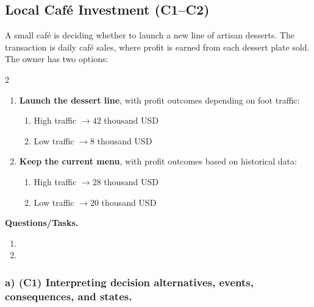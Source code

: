 	\subsection{Local Café Investment (C1--C2)}
	\label{sec:problem1-local-cafe-investment-c1-c2}
	A small café is deciding whether to launch a new line of artisan desserts. The transaction is daily café sales, where profit is earned from each dessert plate sold. The owner has two options:
	\begin{multicols}{2}
		\begin{enumerate}[label=\arabic*.]
			\item \textbf{Launch the dessert line}, with profit outcomes depending on foot traffic:
			\begin{enumerate}[label=\roman*)]
				\item High traffic $\to 42$ thousand USD
				\item Low traffic $\to 8$ thousand USD
			\end{enumerate}
			
			\columnbreak
			
			\item \textbf{Keep the current menu}, with profit outcomes based on historical data:
			\begin{enumerate}[label=\roman*)]
				\item High traffic $\to 28$ thousand USD
				\item Low traffic $\to 20$ thousand USD
			\end{enumerate}
		\end{enumerate}
	\end{multicols}
	
	\textbf{Questions/Tasks.}
	\begin{enumerate}[label=\textbf{\alph*)}]
		\item {}
		\item {}
	\end{enumerate}
	
	\subsubsection*{a) \textbf{(C1)} Interpreting decision alternatives, events, consequences, and states.}
	\label{subsec:problem1-local-cafe-investment-c1}
	
